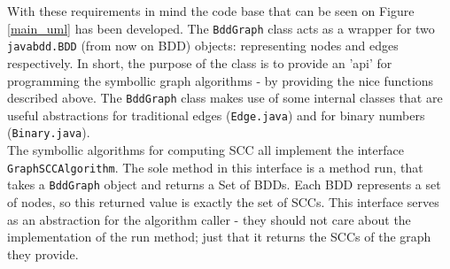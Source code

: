 \documentclass[../master/master.tex]{subfiles}
\begin{document}
With these requirements in mind the code base that can be seen on Figure \ref{main_uml} has been developed. The \texttt{BddGraph} class acts as a wrapper for two \texttt{javabdd.BDD} (from now on BDD) objects: representing nodes and edges respectively. In short, the purpose of the class is to provide an 'api' for programming the symbollic graph algorithms - by providing the nice functions described above. The \texttt{BddGraph} class makes use of some internal classes that are useful abstractions for traditional edges (\texttt{Edge.java}) and for binary numbers (\texttt{Binary.java}).\\

The symbollic algorithms for computing SCC all implement the interface \texttt{GraphSCCAlgorithm}. The sole method in this interface is a method run, that takes a \texttt{BddGraph} object and returns a Set of BDDs. Each BDD represents a set of nodes, so this returned value is exactly the set of SCCs. This interface serves as an abstraction for the algorithm caller - they should not care about the implementation of the run method; just that it returns the SCCs of the graph they provide.
\end{document}
